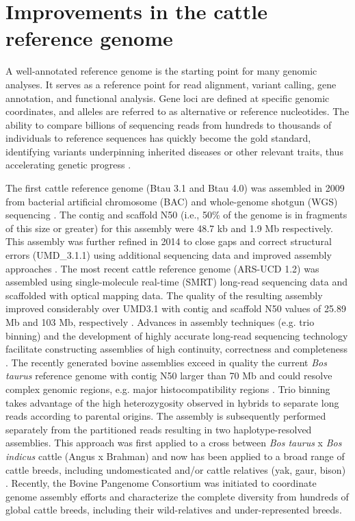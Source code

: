 \documentclass[../main.tex]{subfiles}
\begin{document}
\section{Improvements in the cattle reference genome} 

A well-annotated reference genome is the starting point for many genomic analyses. It serves as a reference point for read alignment, variant calling, gene annotation, and functional analysis. Gene loci are defined at specific genomic coordinates, and alleles are referred to as alternative or reference  nucleotides. The ability to compare billions of sequencing reads from hundreds to thousands of individuals to reference sequences has quickly become the gold standard, identifying variants underpinning  inherited diseases or other relevant traits, thus accelerating genetic progress \citep{bickhart2020symposium}.

The first cattle reference genome (Btau 3.1 and Btau 4.0) was assembled in 2009 from bacterial artificial chromosome (BAC) and whole-genome shotgun (WGS) sequencing \citep{elsik2009genome}. The contig and scaffold N50 (i.e., 50\% of the genome is in fragments of this size or greater) for this assembly were 48.7 kb and 1.9 Mb respectively. This assembly was further refined in 2014 to close gaps and correct structural errors (UMD\_3.1.1) using additional sequencing data and improved assembly approaches \citep{zimin2009whole}. The most recent cattle reference genome (ARS-UCD 1.2) was assembled using single-molecule real-time (SMRT) long-read sequencing data and scaffolded with optical mapping data. The quality of the resulting assembly improved considerably over UMD3.1 with contig and scaffold N50 values of 25.89 Mb and 103 Mb, respectively \citep{rosen2020novo}. Advances in assembly techniques (e.g. trio binning) and the development of highly accurate long-read sequencing technology facilitate constructing assemblies of high continuity, correctness and completeness \citep{bickhart2020symposium}. The recently generated bovine assemblies exceed in quality the current \emph{Bos taurus} reference genome with contig N50 larger than 70 Mb and could resolve complex genomic regions, e.g. major histocompatibility regions \citep{rice2020continuous}. Trio binning takes advantage of the high heterozygosity observed in hybrids to separate long reads according to parental origins. The assembly is subsequently performed separately from the partitioned reads resulting in two haplotype-resolved assemblies. This approach  was first applied  to a cross between \emph{Bos taurus} x \emph{Bos indicus} cattle (Angus x Brahman) \citep{koren2018novo} and now has been applied to a broad range of cattle breeds, including  undomesticated and/or cattle relatives (yak, gaur, bison) \citep{oppenheimer2021reference}. Recently, the Bovine Pangenome Consortium \citep{heaton2021reference} was initiated to coordinate genome assembly efforts and characterize the complete diversity from hundreds of global cattle breeds, including their wild-relatives and under-represented breeds. 
\end{document}

